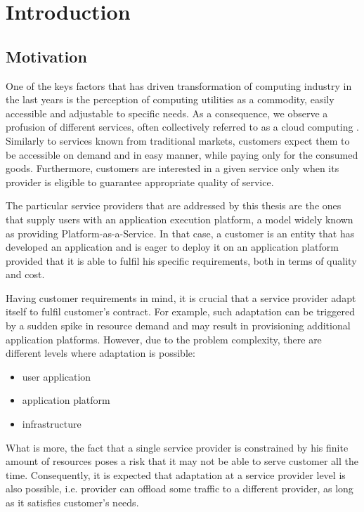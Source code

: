 \chapter{Introduction}

\section{Motivation}
One of the keys factors that has driven transformation of computing industry in the last years is the perception of computing utilities as a commodity\cite{BuYeVeBrBr09}, easily accessible and adjustable to specific needs. As a consequence, we observe a profusion of different services, often collectively referred to as a cloud computing \cite{MeGr11}. Similarly to services known from traditional markets, customers expect them to be accessible on demand and in easy manner, while paying only for the consumed goods. Furthermore, customers are interested in a given service only when its provider is eligible to guarantee appropriate quality of service.

The particular service providers that are addressed by this thesis are the ones that supply users with an application execution platform, a model widely known as providing Platform-as-a-Service. In that case, a customer is an entity that has developed an application and is eager to deploy it on an application platform provided that it is able to fulfil his specific requirements, both in terms of quality and cost.

Having customer requirements in mind, it is crucial that a service provider adapt itself to fulfil customer's contract. For example, such adaptation can be triggered by a sudden spike in resource demand and may result in provisioning additional application platforms. However, due to the problem complexity, there are different levels where adaptation is possible:
\begin{itemize}
	\item user application
	\item application platform
	\item infrastructure
\end{itemize}
What is more, the fact that a single service provider is constrained by his finite amount of resources poses a risk that it may not be able to serve customer all the time. Consequently, it is expected that adaptation at a service provider level is also possible, i.e. provider can offload some traffic to a different provider, as long as it satisfies customer's needs.

